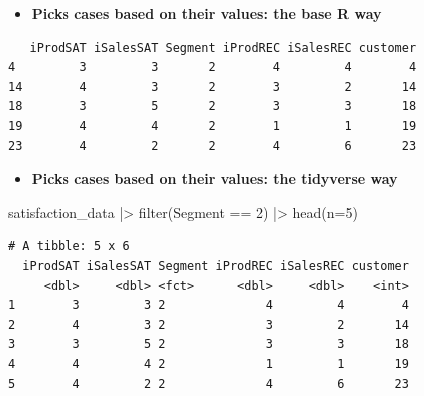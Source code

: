 \documentclass[
  ignorenonframetext,
]{beamer}
\newenvironment{Shaded}{\begin{snugshade}}{\end{snugshade}}
\newcommand{\AttributeTok}[1]{\textcolor[rgb]{0.40,0.45,0.13}{#1}}
\newcommand{\DecValTok}[1]{\textcolor[rgb]{0.68,0.00,0.00}{#1}}
\newcommand{\FunctionTok}[1]{\textcolor[rgb]{0.28,0.35,0.67}{#1}}
\newcommand{\NormalTok}[1]{\textcolor[rgb]{0.00,0.23,0.31}{#1}}
\newcommand{\SpecialCharTok}[1]{\textcolor[rgb]{0.37,0.37,0.37}{#1}}
\providecommand{\tightlist}{%
  \setlength{\itemsep}{0pt}\setlength{\parskip}{0pt}}\usepackage{longtable,booktabs,array}
\begin{document}
\begin{frame}[fragile]{}
\label{section-14}
\begin{itemize}
\tightlist
\item
  \textbf{Picks cases based on their values: the base R way}
\end{itemize}

\tiny

\begin{Shaded}
\end{Shaded}

\begin{verbatim}
   iProdSAT iSalesSAT Segment iProdREC iSalesREC customer
4         3         3       2        4         4        4
14        4         3       2        3         2       14
18        3         5       2        3         3       18
19        4         4       2        1         1       19
23        4         2       2        4         6       23
\end{verbatim}

\normalsize

\begin{itemize}
\tightlist
\item
  \textbf{Picks cases based on their values: the tidyverse way}
\end{itemize}

\tiny

\begin{Shaded}
\begin{Highlighting}[]
\NormalTok{satisfaction\_data }\SpecialCharTok{|\textgreater{}}
  \FunctionTok{filter}\NormalTok{(Segment }\SpecialCharTok{==} \DecValTok{2}\NormalTok{) }\SpecialCharTok{|\textgreater{}}
  \FunctionTok{head}\NormalTok{(}\AttributeTok{n=}\DecValTok{5}\NormalTok{)}
\end{Highlighting}
\end{Shaded}

\begin{verbatim}
# A tibble: 5 x 6
  iProdSAT iSalesSAT Segment iProdREC iSalesREC customer
     <dbl>     <dbl> <fct>      <dbl>     <dbl>    <int>
1        3         3 2              4         4        4
2        4         3 2              3         2       14
3        3         5 2              3         3       18
4        4         4 2              1         1       19
5        4         2 2              4         6       23
\end{verbatim}
\end{frame}
\end{document}
